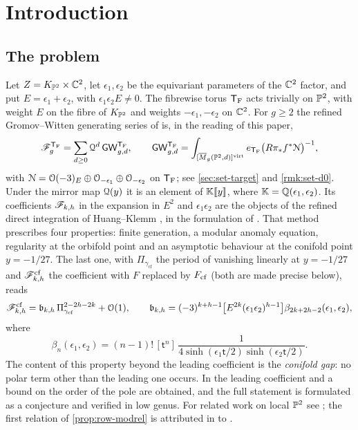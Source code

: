 \section{Introduction}
\label{sec:int}

\subsection{The problem}
\label{sec:int-problem}

Let $Z=K_{\mathbb{P}^2}\times\mathbb{C}^2$, let $\epsilon_1,\epsilon_2$ be the equivariant parameters of the $\mathbb{C}^2$ factor, and put $E=\epsilon_1+\epsilon_2$, with $\epsilon_1\epsilon_2E\neq 0$. The fibrewise torus $\mathsf{T}_{\mathrm{F}}$ acts trivially on $\mathbb{P}^2$, with weight $E$ on the fibre of $K_{\mathbb{P}^2}$ and weights $-\epsilon_1,-\epsilon_2$ on $\mathbb{C}^2$. For $g\geq 2$ the refined Gromov--Witten generating series of \cite{BS} is, in the reading of this paper,
\[
\mathscr{F}_g^{\mathsf{T}_{\mathrm{F}}}=\sum_{d\geq 0}\mathcal{Q}^d\,\mathsf{GW}_{g,d}^{\mathsf{T}_{\mathrm{F}}},\qquad \mathsf{GW}_{g,d}^{\mathsf{T}_{\mathrm{F}}}=\int_{[\overline{M}_g(\mathbb{P}^2,d)]^{\mathrm{virt}}}e_{\mathsf{T}_{\mathrm{F}}}\big(R\pi_*f^*\mathcal{N}\big)^{-1},
\]
with $\mathcal{N}=\mathcal{O}(-3)_{E}\oplus\mathcal{O}_{-\epsilon_1}\oplus\mathcal{O}_{-\epsilon_2}$ on $\mathsf{T}_{\mathrm{F}}$; see \cref{sec:set-target} and \cref{rmk:set-d0}. Under the mirror map $\mathcal{Q}(y)$ it is an element of $\mathbb{K}[\![ y ]\!]$, where $\mathbb{K}=\mathbb{Q}(\epsilon_1,\epsilon_2)$. Its coefficients $\mathscr{F}_{k,h}$ in the expansion in $E^{2}$ and $\epsilon_1\epsilon_2$ are the objects of the refined direct integration of Huang--Klemm \cite{HK10}, in the formulation of \cite{BS}. That method prescribes four properties: finite generation, a modular anomaly equation, regularity at the orbifold point and an asymptotic behaviour at the conifold point $y=-1/27$. The last one, with $\Pi_{\gamma_{\mathrm{cf}}}$ the period of \cite{BS} vanishing linearly at $y=-1/27$ and $\mathscr{F}^{\mathrm{cf}}_{k,h}$ the coefficient with $F$ replaced by $F_{\mathrm{cf}}$ (both are made precise below), reads
\[
\mathscr{F}^{\mathrm{cf}}_{k,h}=\mathfrak{b}_{k,h}\,\Pi_{\gamma_{\mathrm{cf}}}^{2-2h-2k}+\mathcal{O}(1),\qquad
\mathfrak{b}_{k,h}=(-3)^{k+h-1}\big[E^{2k}(\epsilon_1\epsilon_2)^{h-1}\big]\beta_{2k+2h-2}(\epsilon_1,\epsilon_2),
\]
where
\[
\beta_n(\epsilon_1,\epsilon_2)=(n-1)!\,[\mathsf{t}^n]\,\frac{1}{4\sinh(\epsilon_1\mathsf{t}/2)\sinh(\epsilon_2\mathsf{t}/2)}.
\]
The content of this property beyond the leading coefficient is the \emph{conifold gap}: no polar term other than the leading one occurs. In \cite{BS} the leading coefficient and a bound on the order of the pole are obtained, and the full statement is formulated as a conjecture and verified in low genus. For related work on local $\mathbb{P}^2$ see \cite{LP18,BFGW21,CI18}; the first relation of \cref{prop:row-modrel} is attributed in \cite{BS} to \cite{ZZ08}.

